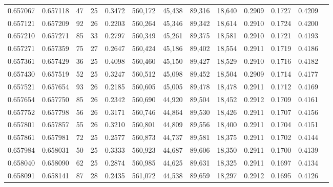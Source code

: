 \begin{tabular}{rrrrrrrrrrrrr}
0.657067 & 0.657118 &  47 &  25 &                                     0.3472 & 560,172 &  45,438 &  89,316 &  18,640 & 0.2909 & 0.1727 & 0.4209 \\
0.657121 & 0.657209 &  92 &  26 &                                     0.2203 & 560,264 &  45,346 &  89,342 &  18,614 & 0.2910 & 0.1724 & 0.4200 \\
0.657210 & 0.657271 &  85 &  33 &                                     0.2797 & 560,349 &  45,261 &  89,375 &  18,581 & 0.2910 & 0.1721 & 0.4193 \\
0.657271 & 0.657359 &  75 &  27 &                                     0.2647 & 560,424 &  45,186 &  89,402 &  18,554 & 0.2911 & 0.1719 & 0.4186 \\
0.657361 & 0.657429 &  36 &  25 &                                     0.4098 & 560,460 &  45,150 &  89,427 &  18,529 & 0.2910 & 0.1716 & 0.4182 \\
0.657430 & 0.657519 &  52 &  25 &                                     0.3247 & 560,512 &  45,098 &  89,452 &  18,504 & 0.2909 & 0.1714 & 0.4177 \\
0.657521 & 0.657654 &  93 &  26 &                                     0.2185 & 560,605 &  45,005 &  89,478 &  18,478 & 0.2911 & 0.1712 & 0.4169 \\
0.657654 & 0.657750 &  85 &  26 &                                     0.2342 & 560,690 &  44,920 &  89,504 &  18,452 & 0.2912 & 0.1709 & 0.4161 \\
0.657752 & 0.657798 &  56 &  26 &                                     0.3171 & 560,746 &  44,864 &  89,530 &  18,426 & 0.2911 & 0.1707 & 0.4156 \\
0.657801 & 0.657857 &  55 &  26 &                                     0.3210 & 560,801 &  44,809 &  89,556 &  18,400 & 0.2911 & 0.1704 & 0.4151 \\
0.657861 & 0.657981 &  72 &  25 &                                     0.2577 & 560,873 &  44,737 &  89,581 &  18,375 & 0.2911 & 0.1702 & 0.4144 \\
0.657984 & 0.658031 &  50 &  25 &                                     0.3333 & 560,923 &  44,687 &  89,606 &  18,350 & 0.2911 & 0.1700 & 0.4139 \\
0.658040 & 0.658090 &  62 &  25 &                                     0.2874 & 560,985 &  44,625 &  89,631 &  18,325 & 0.2911 & 0.1697 & 0.4134 \\
0.658091 & 0.658141 &  87 &  28 &                                     0.2435 & 561,072 &  44,538 &  89,659 &  18,297 & 0.2912 & 0.1695 & 0.4126 \\

\end{tabular}
